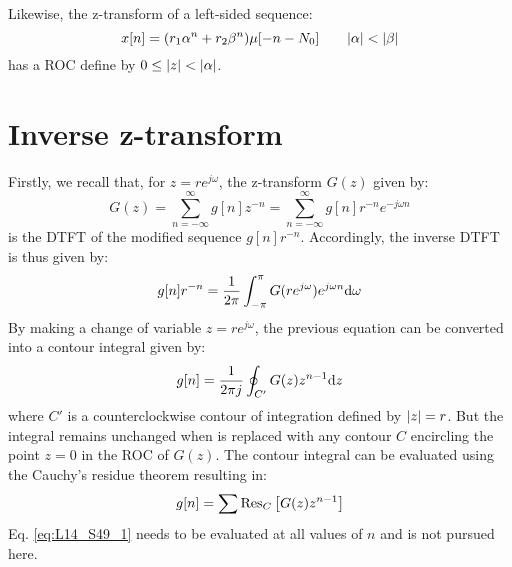 \documentclass[../../main/main.tex]{subfiles}
\begin{document}
Likewise, the z-transform of a left-sided sequence:
\begin{equation}
    x[n]
    =
    \qty(r_{1}\alpha^{n} + r_{2}\beta^{n}) \mu[-n-N_{0}]
    \qquad
    \abs{\alpha} < \abs{\beta}
    \label{eq:L14_S43_1}
\end{equation}
has a ROC define by \( 0 \le \abs{z} < \abs{\alpha} \).





\section{Inverse z-transform}
Firstly, we recall that, for \( z = re^{j\omega} \), the z-transform \( G(z) \) given by:
\begin{equation}
    G(z)
    =
    \sum_{n=-\infty}^{\infty} g[n]z^{-n}
    =
    \sum_{n=-\infty}^{\infty} g[n]r^{-n}e^{-j\omega n}
    \label{eq:L14_S47_1}
\end{equation}
is the DTFT of the modified sequence \( g[n]r^{-n} \). Accordingly, the inverse DTFT is thus given by:
\begin{equation}
    g[n]r^{-n}
    =
    \frac{1}{2\pi} \int_{-\pi}^{\pi} G(re^{j\omega})e^{j\omega n} \mathrm{d}{\omega}
    \label{eq:L14_S47_2}
\end{equation}
By making a change of variable \( z = re^{j\omega} \), the previous equation can be converted into a contour integral given by:
\begin{equation}
    g[n]
    =
    \frac{1}{2\pi j} \oint_{C'} G(z)z^{n-1} \mathrm{d}{z}
    \label{eq:L14_S48_1}
\end{equation}
where \( C' \) is a counterclockwise contour of integration defined by \( \abs{z} = r \).
But the integral remains unchanged when is replaced with any contour \( C \) encircling the point \( z = 0 \) in the ROC of \( G(z) \). The contour integral can be evaluated using the Cauchy's residue theorem resulting in:
\begin{equation}
    g[n]
    =
    \sum \operatorname{Res}_{C}\qty[G(z)z^{n-1}]
    \label{eq:L14_S49_1}
\end{equation}
Eq. \ref{eq:L14_S49_1} needs to be evaluated at all values of \( n \) and is not pursued here.
\end{document}
